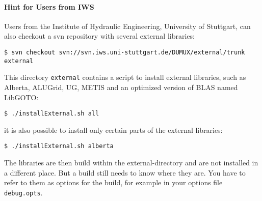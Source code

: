 \paragraph{Hint for Users from IWS} Users from the Institute of Hydraulic Engineering, University of Stuttgart,
can also checkout a svn repository with several external libraries: 

\begin{lstlisting}[style=Bash]
$ svn checkout svn://svn.iws.uni-stuttgart.de/DUMUX/external/trunk external
\end{lstlisting}

This directory \texttt{external} contains a script to install external libraries, such as 
Alberta, ALUGrid, UG, METIS and an optimized version of BLAS named LibGOTO: 
\begin{lstlisting}[style=Bash]
$ ./installExternal.sh all
\end{lstlisting}
it is also possible to install only certain parts of the external libraries:
\begin{lstlisting}[style=Bash]
$ ./installExternal.sh alberta
\end{lstlisting}

The libraries are then build within the external-directory and are not installed in a different place. 
But a \Dune build still needs to know where they are. You have to refer to them as options for the \Dune build, for example in your options file \texttt{debug.opts}.


